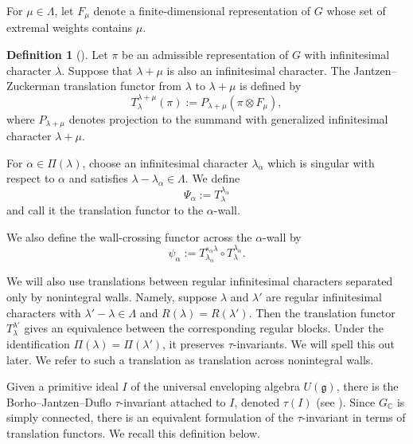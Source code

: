 \documentclass{amsart}
\theoremstyle{definition}
\newtheorem{definition}[thm]{Definition}
\begin{document}
For $\mu\in\Lambda$, let $F_\mu$ denote a finite-dimensional representation of $G$ whose set of extremal weights contains $\mu$.

\begin{definition}[{\cite[Definition 4.5.7]{V81}}]
Let $\pi$ be an admissible representation of $G$ with infinitesimal character $\lambda$. Suppose that $\lambda+\mu$ is also an infinitesimal character. The Jantzen--Zuckerman translation functor from $\lambda$ to $\lambda+\mu$ is defined by
\begin{equation*}
T_\lambda^{\lambda+\mu}(\pi)
:=
P_{\lambda+\mu}(\pi\otimes F_\mu),
\end{equation*}
where $P_{\lambda+\mu}$ denotes projection to the summand with generalized infinitesimal character $\lambda+\mu$.



For $\alpha\in\Pi(\lambda)$, choose an infinitesimal character
$\lambda_\alpha$ which is singular with respect to $\alpha$ and satisfies 
$\lambda-\lambda_\alpha\in\Lambda.$ We define
$$
\Psi _\alpha := T _\lambda^{\lambda_\alpha} 
$$
and call it the translation functor  to the $\alpha$-wall.


We also define the wall-crossing functor across the $\alpha$-wall by
\begin{equation*}
\psi_\alpha
:=T_{\lambda_\alpha}^{s_\alpha\lambda}\circ T_\lambda^{\lambda_\alpha}.
\end{equation*}
\end{definition}


We will also use translations between regular infinitesimal characters separated only by nonintegral walls. Namely, suppose $\lambda$ and $\lambda'$ are regular infinitesimal characters with $\lambda'-\lambda\in\Lambda$ and $R(\lambda)=R(\lambda')$. Then the translation functor $T_\lambda^{\lambda'}$ gives an equivalence between the corresponding regular blocks. Under the identification $\Pi(\lambda)=\Pi(\lambda')$, it preserves $\tau$-invariants. We will spell this out later. We refer to such a translation as translation across nonintegral walls.

\bigskip


Given a primitive ideal $I$ of the universal enveloping algebra $U(\mathfrak g)$, there is the Borho--Jantzen--Duflo $\tau$-invariant attached to $I$, denoted $\tau(I)$ (see \cite{V79a}). Since $G_{\mathbb C}$ is simply connected, there is an equivalent formulation of the $\tau$-invariant in terms of translation functors. We recall this definition below.
\end{document}
